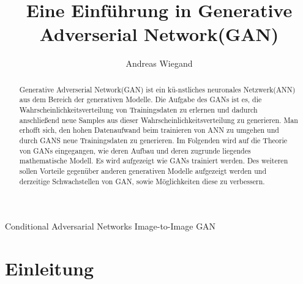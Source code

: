 \documentclass{llncs}
\begin{document}
\begin{acronym}[Bash]
	Conditional Adversarial Networks
	 Image-to-Image GAN
\end{acronym}
\title{Eine Einführung in Generative Adverserial Network(GAN)}
\author{Andreas Wiegand}
\maketitle								%
%
\begin{abstract}		
Generative Adverserial Network(GAN) ist ein kü-nstliches neuronales Netzwerk(ANN) aus dem Bereich der generativen Modelle. Die Aufgabe des GANs ist es, die Wahrscheinlichkeitsverteilung von Trainingsdaten zu erlernen und dadurch anschließend neue Samples aus dieser Wahrscheinlichkeitsverteilung zu generieren. Man erhofft sich, den hohen Datenaufwand beim trainieren von ANN zu umgehen und durch GANS neue Trainingsdaten zu generieren. Im Folgenden wird auf die Theorie von GANs eingegangen, wie deren Aufbau und deren zugrunde liegendes mathematische Modell. Es wird aufgezeigt wie GANs trainiert werden. Des weiteren sollen Vorteile gegenüber anderen generativen Modelle aufgezeigt werden und derzeitige Schwachstellen von GAN, sowie Möglichkeiten diese zu verbessern.
\end{abstract}
%
\section{Einleitung}%
\end{document}
